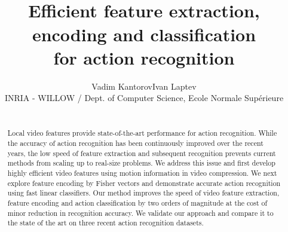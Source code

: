 \documentclass[10pt,twocolumn,letterpaper]{article}
\begin{document}

\title{\mbox{}\vspace{-1cm}\\Efficient feature extraction, encoding and classification\\ for action recognition\vspace{-.2cm}\\}

\author{Vadim Kantorov\qquad Ivan Laptev\\INRIA - WILLOW / Dept. of Computer Science, Ecole Normale Supérieure}

\maketitle

\begin{abstract}

\mbox{}\vspace{-.6cm}\\
Local video features provide state-of-the-art performance for action recognition. While the accuracy of action recognition has been continuously improved over the recent years, the low speed of feature extraction and subsequent recognition prevents current methods from scaling up to real-size problems. We address this issue and first develop highly efficient video features using motion information in video compression. We next explore feature encoding by Fisher vectors and demonstrate accurate action recognition using fast linear classifiers. Our method improves the speed of video feature extraction, feature encoding and action classification by two orders of magnitude at the cost of minor reduction in recognition accuracy. We validate our approach and compare it to the state of the art on three recent action recognition datasets.

\end{abstract}

%
%
\end{document}
